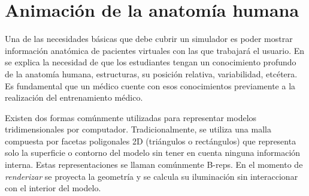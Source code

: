 \section{Animación de la anatomía humana} 
\label{art:anatomy}



Una de las necesidades básicas que debe cubrir un simulador es poder mostrar información anatómica de pacientes virtuales con las que trabajará el usuario. En  \cite{preim2018survey} se explica la necesidad de que los estudiantes tengan un conocimiento profundo de la anatomía humana, estructuras, su posición relativa, variabilidad, etcétera. Es fundamental que un médico cuente con esos conocimientos previamente a la realización del entrenamiento médico.

Existen dos formas comúnmente utilizadas para representar modelos tridimensionales por computador. Tradicionalmente, se utiliza una malla compuesta por facetas poligonales 2D (triángulos o rectángulos) que representa solo la superficie o contorno del modelo sin tener en cuenta ninguna información interna. Estas representaciones se llaman comúnmente \acp{B-rep}. En el momento de \emph{renderizar} se proyecta la geometría y se calcula su iluminación sin interaccionar con el interior del modelo.

